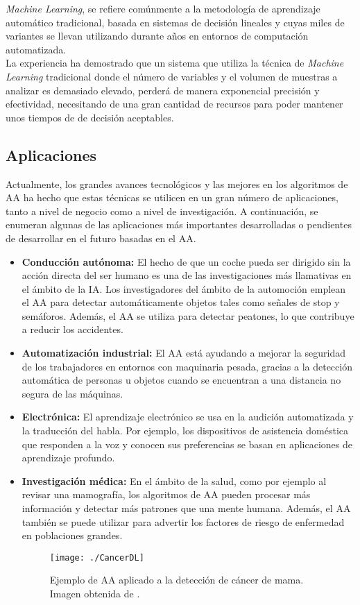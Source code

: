 \documentclass[a4paper, 12pt, oneside]{book}
\begin{document}
\textit{Machine Learning}, se refiere comúnmente a la metodología de aprendizaje automático tradicional, basada en sistemas de decisión lineales y cuyas miles de variantes se llevan utilizando durante años en entornos de computación automatizada.\\

La experiencia ha demostrado que un sistema que utiliza la técnica de \textit{Machine Learning} tradicional donde el número de variables y el volumen de muestras a analizar es demasiado elevado, perderá de manera exponencial precisión y efectividad, necesitando de una gran cantidad de recursos para poder mantener unos tiempos de de decisión aceptables.

\subsection{Aplicaciones}

Actualmente, los grandes avances tecnológicos y las mejores en los algoritmos de AA ha hecho que estas técnicas se utilicen en un gran número de aplicaciones, tanto a nivel de negocio como a nivel de investigación. A continuación, se enumeran algunas de las aplicaciones más importantes desarrolladas o pendientes de desarrollar en el futuro basadas en el AA.

\begin{itemize}
\item \textbf{Conducción autónoma:} El hecho de que un coche pueda ser dirigido sin la acción directa del ser humano es una de las investigaciones más llamativas en el ámbito de la IA. Los investigadores del ámbito de la automoción emplean el AA para detectar automáticamente objetos tales como señales de stop y semáforos. Además, el AA se utiliza para detectar peatones, lo que contribuye a reducir los accidentes.
\item \textbf{Automatización industrial:} El AA está ayudando a mejorar la seguridad de los trabajadores en entornos con maquinaria pesada, gracias a la detección automática de personas u objetos cuando se encuentran a una distancia no segura de las máquinas.
\item \textbf{Electrónica:} El aprendizaje electrónico se usa en la audición automatizada y la traducción del habla. Por ejemplo, los dispositivos de asistencia doméstica que responden a la voz y conocen sus preferencias se basan en aplicaciones de aprendizaje profundo.
\item \textbf{Investigación médica:} En el ámbito de la salud, como por ejemplo al revisar una mamografía, los algoritmos de AA pueden procesar más información y detectar más patrones que una mente humana. Además, el AA también se puede utilizar para advertir los factores de riesgo de enfermedad en poblaciones grandes.
\begin{figure}[H]
\begin{center}
\texttt{[image: ./CancerDL]}
\caption{Ejemplo de AA aplicado a la detección de cáncer de mama. Imagen obtenida de \cite{CancerMamaDeepLearning}.}
\label{MArcoIA}
\end{center}
\end{figure}
\end{itemize}
\end{document}
